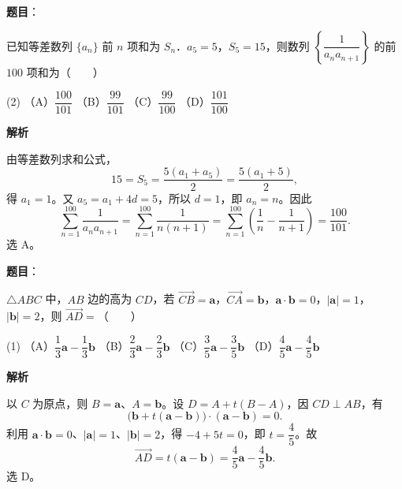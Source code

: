 \begin{answer}

\textbf{题目}：

已知等差数列 $\{a_n\}$ 前 $n$ 项和为 $S_n$．$a_5=5$，$S_5=15$，则数列 $\left\{\dfrac1{a_na_{n+1}}\right\}$ 的前 $100$ 项和为\mbox{（　　）}

\begin{gkopts}(2)
\task （A）$\dfrac{100}{101}$
\task （B）$\dfrac{99}{101}$
\task （C）$\dfrac{99}{100}$
\task （D）$\dfrac{101}{100}$
\end{gkopts}

\textbf{解析}

由等差数列求和公式，
\nopagebreak[4]
\[
15=S_5=\frac{5(a_1+a_5)}2=\frac{5(a_1+5)}2,
\]
得 $a_1=1$。又 $a_5=a_1+4d=5$，所以 $d=1$，即 $a_n=n$。因此
\nopagebreak[4]
\[
\sum_{n=1}^{100}\frac1{a_na_{n+1}}
=\sum_{n=1}^{100}\frac1{n(n+1)}
=\sum_{n=1}^{100}\left(\frac1n-\frac1{n+1}\right)
=\frac{100}{101}.
\]
选 A。


\end{answer}
\begin{answer}

\textbf{题目}：

$\triangle ABC$ 中，$AB$ 边的高为 $CD$，若 $\overrightarrow{CB}=\boldsymbol a$，$\overrightarrow{CA}=\boldsymbol b$，$\boldsymbol a\cdot\boldsymbol b=0$，$|\boldsymbol a|=1$，$|\boldsymbol b|=2$，则 $\overrightarrow{AD}=$\mbox{（　　）}

\begin{gkopts}(1)
\task （A）$\dfrac13\boldsymbol a-\dfrac13\boldsymbol b$
\task （B）$\dfrac23\boldsymbol a-\dfrac23\boldsymbol b$
\task （C）$\dfrac35\boldsymbol a-\dfrac35\boldsymbol b$
\task （D）$\dfrac45\boldsymbol a-\dfrac45\boldsymbol b$
\end{gkopts}

\textbf{解析}

以 $C$ 为原点，则 $B=\boldsymbol a$、$A=\boldsymbol b$。设 $D=A+t(B-A)$，因 $CD\perp AB$，有
\nopagebreak[4]
\[
\bigl(\boldsymbol b+t(\boldsymbol a-\boldsymbol b)\bigr)\cdot(\boldsymbol a-\boldsymbol b)=0.
\]
利用 $\boldsymbol a\cdot\boldsymbol b=0$、$|\boldsymbol a|=1$、$|\boldsymbol b|=2$，得 $-4+5t=0$，即 $t=\dfrac45$。故
\nopagebreak[4]
\[
\overrightarrow{AD}=t(\boldsymbol a-\boldsymbol b)=\frac45\boldsymbol a-\frac45\boldsymbol b.
\]
选 D。


\end{answer}
